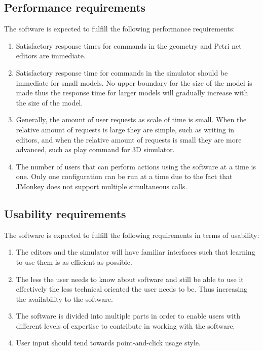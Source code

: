 \subsection{Performance requirements}
The software is expected to fulfill the following performance requirements:
\begin{enumerate}
	\item Satisfactory response times for commands in the geometry and Petri net editors are immediate.
	\item Satisfactory response time for commands in the simulator should be immediate for small models. No upper boundary for the size of the model is made thus the response time for larger models will gradually increase with the size of the model.
	\item Generally, the amount of user requests as scale of time is small. When the relative amount of requests is large they are simple, such as writing in editors, and when the relative amount of requests is small they are more advanced, such as play command for 3D simulator.
	\item The number of users that can perform actions using the software at a time is one. Only one configuration can be run at a time due to the fact that JMonkey does not support multiple simultaneous calls. 
\end{enumerate}

\subsection{Usability requirements}
The software is expected to fulfill the following requirements in terms of usability:
\begin{enumerate}
	\item The editors and the simulator will have familiar interfaces such that learning to use them is as efficient as possible.
	\item The less the user needs to know about software and still be able to use it effectively the less technical oriented the user needs to be. Thus increasing the availability to the software.
	\item The software is divided into multiple parts in order to enable users with different levels of expertise to contribute in working with the software.
	\item User input should tend towards point-and-click usage style.
\end{enumerate}